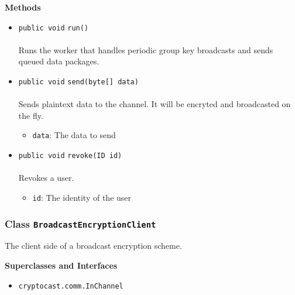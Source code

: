 \textbf{\sffamily Methods}
\begin{itemize}
\item \lstinline|public void| \lstinline|run|\lstinline|()|\\ \\[-0.6em]
Runs the worker that handles periodic group key broadcasts and sends
 queued data packages.



\item \lstinline|public void| \lstinline|send|\lstinline|(byte[] data)|\\ \\[-0.6em]
Sends plaintext data to the channel. It will be encryted and broadcasted
 on the fly.
\begin{itemize}
\item \lstinline|data|: The data to send
\end{itemize}



\item \lstinline|public void| \lstinline|revoke|\lstinline|(ID id)|\\ \\[-0.6em]
Revokes a user.
\begin{itemize}
\item \lstinline|id|: The identity of the user
\end{itemize}



\end{itemize}

\subsubsection{Class \lstinline|BroadcastEncryptionClient|}
The client side of a broadcast encryption scheme. \\
\noindent\begin{minipage}[t]{5cm}
\vspace{0.3em}
\hspace*{2em}
\vspace{0.3em}
\end{minipage}



\textbf{\sffamily Superclasses and Interfaces}
\begin{itemize}
\item \lstinline|cryptocast.comm.InChannel|
\end{itemize}


